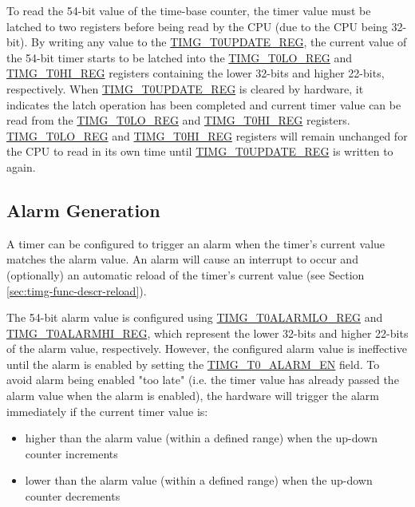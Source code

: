 \documentclass[main\_\_EN.tex]{subfiles}
\begin{document}
To read the 54-bit value of the time-base counter, the timer value must be latched to two registers before being read by the CPU (due to the CPU being 32-bit). By writing any value to the \hyperref[regdesc:TIMGTXUPDATEREG]{TIMG\_T0UPDATE\_REG}, the current value of the 54-bit timer starts to be latched into the \hyperref[regdesc:TIMGTXLOREG]{TIMG\_T0LO\_REG} and \hyperref[regdesc:TIMGTXHIREG]{TIMG\_T0HI\_REG} registers containing the lower 32-bits and 
higher 22-bits, respectively. When \hyperref[regdesc:TIMGTXUPDATEREG]{TIMG\_T0UPDATE\_REG} is cleared by hardware, it indicates the latch operation has been completed and current timer value can be read from the \hyperref[regdesc:TIMGTXLOREG]{TIMG\_T0LO\_REG} and \hyperref[regdesc:TIMGTXHIREG]{TIMG\_T0HI\_REG} registers. \hyperref[regdesc:TIMGTXLOREG]{TIMG\_T0LO\_REG} and \hyperref[regdesc:TIMGTXHIREG]{TIMG\_T0HI\_REG} registers will remain unchanged for the CPU to read in its own time until \hyperref[regdesc:TIMGTXUPDATEREG]{TIMG\_T0UPDATE\_REG} is written to again.



\subsection{Alarm Generation}
A timer can be configured to trigger an alarm when the timer's current value matches the alarm value. An alarm will cause an interrupt to occur and (optionally) an automatic reload of the timer's current value (see Section \ref{sec:timg-func-descr-reload}). 

The 54-bit alarm value is configured using \hyperref[regdesc:TIMGTXALARMLOREG]{TIMG\_T0ALARMLO\_REG} and \hyperref[regdesc:TIMGTXALARMHIREG]{TIMG\_T0ALARMHI\_REG}, which represent the lower 32-bits and higher 22-bits of the alarm value, respectively. However, the configured alarm value is ineffective until the alarm is enabled by setting the \hyperref[fielddesc:TIMGTXALARMEN]{TIMG\_T0\_ALARM\_EN} field. To avoid alarm being enabled "too late" (i.e. the timer value has already passed the alarm value when the alarm is enabled), the hardware will trigger the alarm immediately if the current timer value is:
\begin{itemize}
    \item higher than the alarm value (within a defined range) when the up-down counter increments
    \item lower than the alarm value (within a defined range) when the up-down counter decrements
\end{itemize}
\end{document}
